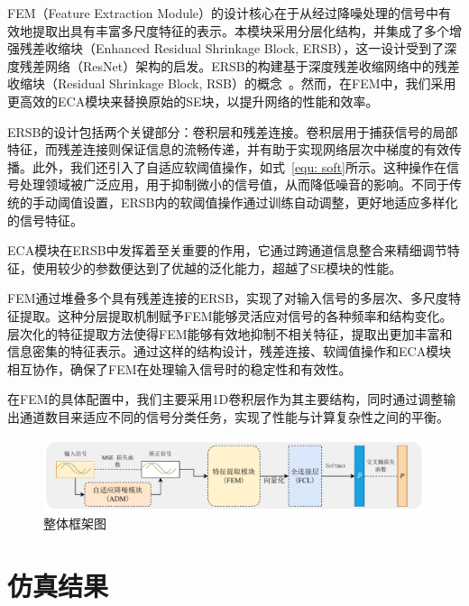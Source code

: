 FEM（Feature Extraction Module）的设计核心在于从经过降噪处理的信号中有效地提取出具有丰富多尺度特征的表示。本模块采用分层化结构，并集成了多个增强残差收缩块（Enhanced Residual Shrinkage Block, ERSB），这一设计受到了深度残差网络（ResNet）架构的启发。ERSB的构建基于深度残差收缩网络中的残差收缩块（Residual Shrinkage Block, RSB）的概念~\cite{zhao2019deep}。然而，在FEM中，我们采用更高效的ECA模块来替换原始的SE块，以提升网络的性能和效率。

ERSB的设计包括两个关键部分：卷积层和残差连接。卷积层用于捕获信号的局部特征，而残差连接则保证信息的流畅传递，并有助于实现网络层次中梯度的有效传播。此外，我们还引入了自适应软阈值操作，如式~\eqref{equ: soft}所示。这种操作在信号处理领域被广泛应用，用于抑制微小的信号值，从而降低噪音的影响。不同于传统的手动阈值设置，ERSB内的软阈值操作通过训练自动调整，更好地适应多样化的信号特征。

ECA模块在ERSB中发挥着至关重要的作用，它通过跨通道信息整合来精细调节特征，使用较少的参数便达到了优越的泛化能力，超越了SE模块的性能。

FEM通过堆叠多个具有残差连接的ERSB，实现了对输入信号的多层次、多尺度特征提取。这种分层提取机制赋予FEM能够灵活应对信号的各种频率和结构变化。层次化的特征提取方法使得FEM能够有效地抑制不相关特征，提取出更加丰富和信息密集的特征表示。通过这样的结构设计，残差连接、软阈值操作和ECA模块相互协作，确保了FEM在处理输入信号时的稳定性和有效性。

在FEM的具体配置中，我们主要采用1D卷积层作为其主要结构，同时通过调整输出通道数目来适应不同的信号分类任务，实现了性能与计算复杂性之间的平衡。

\begin{figure}
    \centering
    \includegraphics[width=\textwidth]{Image/ad-amr-overview_cn.pdf}
    \caption{整体框架图}
   \label{fig:ad-amr-overview}
\end{figure}

\section{仿真结果}\label{sec:background}
